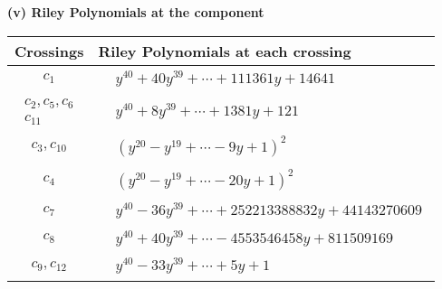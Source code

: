 \documentclass[1p]{elsarticle_modified}
\theoremstyle{definition}
\begin{document}
\newpage\renewcommand{\arraystretch}{1}
\flushleft \textbf{(v) Riley Polynomials at the component}\newline \\
\begin{tabular}{m{50pt}|m{274pt}}
Crossings & \hspace{64pt}Riley Polynomials at each crossing \\
\hline $$\begin{aligned}c_{1}\end{aligned}$$&$\begin{aligned}
&y^{40}+40 y^{39}+\cdots+111361 y+14641
\end{aligned}$\\
\hline $$\begin{aligned}c_{2},c_{5},c_{6}\\c_{11}\end{aligned}$$&$\begin{aligned}
&y^{40}+8 y^{39}+\cdots+1381 y+121
\end{aligned}$\\
\hline $$\begin{aligned}c_{3},c_{10}\end{aligned}$$&$\begin{aligned}
&(y^{20}- y^{19}+\cdots-9 y+1)^{2}
\end{aligned}$\\
\hline $$\begin{aligned}c_{4}\end{aligned}$$&$\begin{aligned}
&(y^{20}- y^{19}+\cdots-20 y+1)^{2}
\end{aligned}$\\
\hline $$\begin{aligned}c_{7}\end{aligned}$$&$\begin{aligned}
&y^{40}-36 y^{39}+\cdots+252213388832 y+44143270609
\end{aligned}$\\
\hline $$\begin{aligned}c_{8}\end{aligned}$$&$\begin{aligned}
&y^{40}+40 y^{39}+\cdots-4553546458 y+811509169
\end{aligned}$\\
\hline $$\begin{aligned}c_{9},c_{12}\end{aligned}$$&$\begin{aligned}
&y^{40}-33 y^{39}+\cdots+5 y+1
\end{aligned}$\\
\hline
\end{tabular}\\~\\
\end{document}
